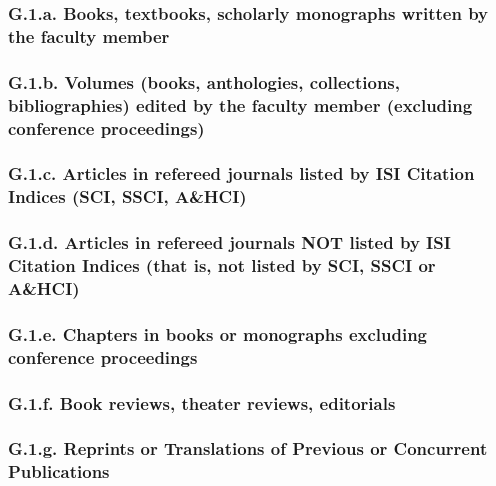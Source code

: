 \documentclass[10pt]{article}
\begin{document}
\subsubsection*{G.1.a. Books, textbooks, scholarly monographs written by the faculty member}



\subsubsection*{G.1.b. Volumes (books, anthologies, collections, bibliographies) edited by the faculty member (excluding conference proceedings)}




\subsubsection*{G.1.c. Articles in refereed journals listed by ISI Citation Indices (SCI, SSCI, A\&HCI)}



\subsubsection*{G.1.d. Articles in refereed journals NOT listed by ISI Citation Indices (that is, not listed by SCI, SSCI or A\&HCI)}



\subsubsection*{G.1.e. Chapters in books or monographs excluding conference proceedings}



\subsubsection*{G.1.f. Book reviews, theater reviews, editorials}




\subsubsection*{G.1.g. Reprints or Translations of Previous or Concurrent Publications}


\end{document}

